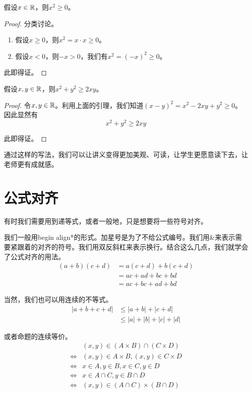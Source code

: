 \begin{lemma}[重要引理]
假设$x\in \mathbb{R}$，则$x^2\ge 0$。
\end{lemma}
\begin{proof}
分类讨论。
\begin{enumerate}
    \item 假设$x\ge 0$，则$x^2=x\cdot x\ge 0$。
    \item 假设$x<0$，则$-x>0$，我们有$x^2=(-x)^2\ge 0$。
\end{enumerate}

此即得证。
\end{proof}

\begin{proposition}[重要命题]
假设$x,y\in\mathbb{R}$，则$x^2+y^2\ge 2xy$。
\end{proposition}
\begin{proof}
令$x,y\in\mathbb{R}$。利用上面的引理，我们知道$(x-y)^2=x^2-2xy+y^2\ge 0$。因此显然有
\[  x^2+y^2\ge 2xy    \]

此即得证。
\end{proof}

\begin{remark}
通过这样的写法，我们可以让讲义变得更加美观、可读，让学生更愿意读下去，让老师更有成就感。
\end{remark}


\section{公式对齐}

有时我们需要用到递等式，或者一般地，只是想要将一些符号对齐。

我们一般用begin align*的形式。加星号是为了不给公式编号。我们用\&来表示需要紧跟着的对齐的符号。我们用双反斜杠来表示换行。结合这么几点，我们就学会了公式对齐的用法。
\begin{align*}
(a+b)(c+d) &=
a(c+d)+b(c+d)\\
&=ac+ad+bc+bd\\
&=ac+bc+ad+bd
\end{align*}

当然，我们也可以用连续的不等式。
\begin{align*}
|a+b+c+d|
&\le |a+b|+|c+d|  \\
&\le |a|+|b|+|c|+|d|
\end{align*}

或者命题的连续等价。
\begin{align*}
&(x,y)\in (A\times B)\cap(C\times D)\\
\iff &(x,y)\in A\times B, (x,y)\in C\times D\\
\iff &x\in A,y\in B,x\in C,y\in D\\
\iff &x\in A\cap C,y\in B\cap D\\
\iff &(x,y)\in (A\cap C)\times (B\cap D)
\end{align*}

